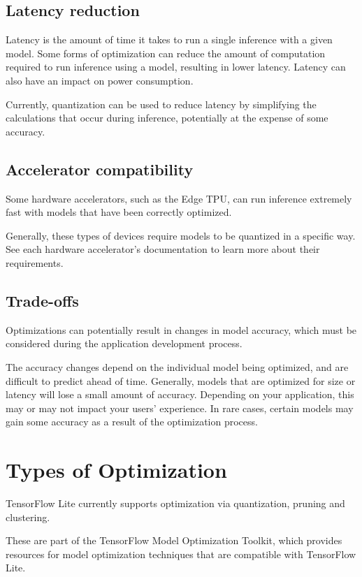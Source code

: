 \subsection{Latency reduction}
Latency is the amount of time it takes to run a single inference with a given model. Some forms of optimization can reduce the amount of computation required to run inference using a model, resulting in lower latency. Latency can also have an impact on power consumption.

Currently, quantization can be used to reduce latency by simplifying the calculations that occur during inference, potentially at the expense of some accuracy. \cite{tfl_Opt:2024}

\subsection{Accelerator compatibility}
Some hardware accelerators, such as the Edge TPU, can run inference extremely fast with models that have been correctly optimized.

Generally, these types of devices require models to be quantized in a specific way. See each hardware accelerator's documentation to learn more about their requirements. \cite{tfl_Opt:2024}

\subsection{Trade-offs}
Optimizations can potentially result in changes in model accuracy, which must be considered during the application development process.

The accuracy changes depend on the individual model being optimized, and are difficult to predict ahead of time. Generally, models that are optimized for size or latency will lose a small amount of accuracy. Depending on your application, this may or may not impact your users' experience. In rare cases, certain models may gain some accuracy as a result of the optimization process. \cite{tfl_Opt:2024}

\section{Types of Optimization}
TensorFlow Lite currently supports optimization via quantization, pruning and clustering.

These are part of the TensorFlow Model Optimization Toolkit, which provides resources for model optimization techniques that are compatible with TensorFlow Lite.

